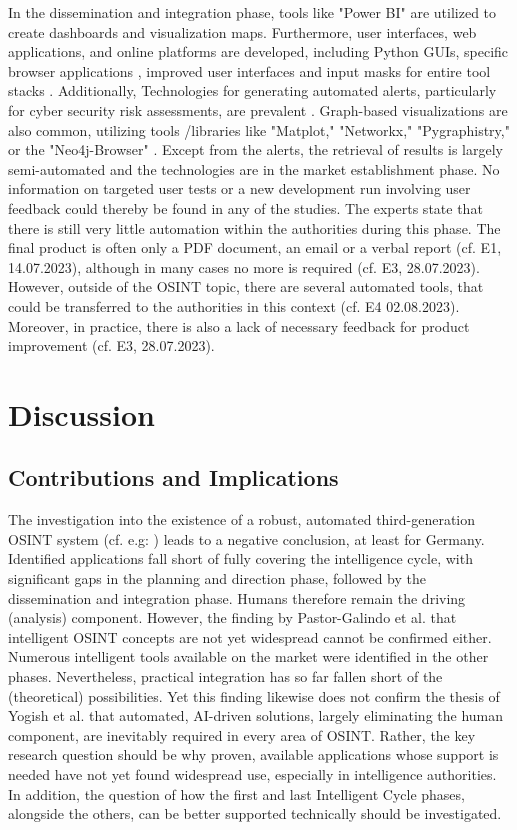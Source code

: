 \documentclass[10pt]{article}
\begin{document}
In the dissemination and integration phase, tools like "Power BI" \cite{Tao.2023}
are utilized to create dashboards and visualization maps. Furthermore, user interfaces,
web applications, and online platforms are developed, including Python GUIs,
specific browser applications \cite{Elmas.2022},
improved user interfaces and input masks for entire tool stacks \cite{Arjun.2020}.
Additionally, Technologies for generating automated alerts, particularly for cyber security risk assessments,
are prevalent \cite{Ahuja.2022}. Graph-based visualizations are also common, utilizing tools
/libraries like "Matplot," "Networkx," "Pygraphistry," or the "Neo4j-Browser" \cite{Middleton.2020}.
Except from the alerts, the retrieval of results is largely semi-automated and the technologies are in the
market establishment phase. No information on targeted user tests or a new development run involving
user feedback could thereby be found in any of the studies. The experts state that there is still very little
automation within the authorities during this phase. The final product is often only a PDF document,
an email or a verbal report (cf. E1, 14.07.2023), although in many cases no more is required (cf. E3, 28.07.2023).
However, outside of the OSINT topic, there are several automated tools, that could be transferred
to the authorities in this context (cf. E4 02.08.2023). Moreover, in practice, there is also a lack of
necessary feedback for product improvement (cf. E3, 28.07.2023).

\section{Discussion}

\subsection{Contributions and Implications}

The investigation into the existence of a robust, automated third-generation OSINT system
(cf. e.g: \cite{Ghioni.2023,PastorGalindo.2020,Yogish.2021})
leads to a negative conclusion, at least for Germany. Identified applications fall short of fully covering
the intelligence cycle, with significant gaps in the planning and direction phase,
followed by the dissemination and integration phase. Humans therefore remain the driving (analysis)
component. However, the finding by Pastor-Galindo et al. \cite{PastorGalindo.2020} that intelligent OSINT
concepts are not yet widespread cannot be confirmed either. Numerous intelligent tools available
on the market were identified in the other phases. Nevertheless, practical integration has so far
fallen short of the (theoretical) possibilities. Yet this finding likewise does not confirm the
thesis of Yogish et al. \cite{Yogish.2021} that automated, AI-driven solutions, largely eliminating
the human component, are inevitably required in every area of OSINT. Rather, the key research
question should be why proven, available applications whose support is needed have not
yet found widespread use, especially in intelligence authorities. In addition, the question of how the
first and last Intelligent Cycle phases, alongside the others, can be better supported technically
should be investigated.
\end{document}
